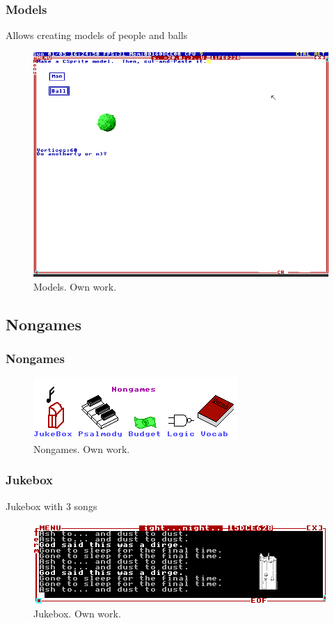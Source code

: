 \documentclass{beamer}
\begin{document}
	\begin{frame}
		\frametitle{Models}
		Allows creating models of people and balls
		\begin{figure}
			\centering
			\includegraphics[width=0.6\linewidth]{images/models.png}
			\caption{Models. Own work.}
			\label{fig:models}
		\end{figure}
	\end{frame}

	\subsection{Nongames}
	\begin{frame}
		\frametitle{Nongames}
		\begin{figure}
			\centering
			\includegraphics[width=0.5\linewidth]{images/nongames.png}
			\caption{Nongames. Own work.}
			\label{fig:nongames}
		\end{figure}
	\end{frame}

	\begin{frame}
		\frametitle{Jukebox}
		Jukebox with 3 songs
		\begin{figure}
			\centering
			\includegraphics[width=0.6\linewidth]{images/jukebox.png}
			\caption{Jukebox. Own work.}
			\label{fig:jukebox}
		\end{figure}
	\end{frame}
\end{document}
